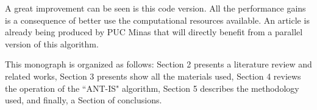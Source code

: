 A great improvement can be seen is this code version. All the performance gains is a consequence of better use the computational resources available. An article is already being produced by PUC Minas that will directly benefit from a parallel version of this algorithm.

This monograph is organized as follows: Section 2 presents a literature review and related works, Section 3 presents show all the materials used, Section 4 reviews the operation of the ``ANT-IS" algorithm, Section 5 describes the methodology used, and finally, a Section of conclusions.
